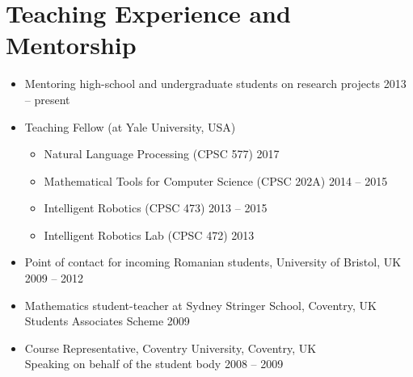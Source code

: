 \documentclass[10pt,letterpaper]{article}
\newcommand{\thing}[2]{{#1} \hfill {#2}}
\begin{document}
\section{Teaching Experience and Mentorship}
\begin{itemize}\setlength\itemsep{0em}
\item \thing{Mentoring high-school and undergraduate students on research projects}{2013 -- present}
\item Teaching Fellow (at Yale University, USA)
	\begin{itemize}\setlength\itemsep{0em}
	\item \thing{Natural Language Processing (CPSC 577)}{2017}
	\item \thing{Mathematical Tools for Computer Science (CPSC 202A)}{2014 -- 2015}
	\item \thing{Intelligent Robotics (CPSC 473)}{2013 -- 2015}
	\item \thing{Intelligent Robotics Lab (CPSC 472)}{2013}
	\end{itemize}
\item \thing{Point of contact for incoming Romanian students, University of Bristol, UK}{2009 -- 2012}
\item \thing{Mathematics student-teacher at Sydney Stringer School, Coventry, UK\\Students Associates Scheme}{2009}
\item \thing{Course Representative, Coventry University, Coventry, UK\\Speaking on behalf of the student body}{2008 -- 2009}
\end{itemize}
\end{document}
